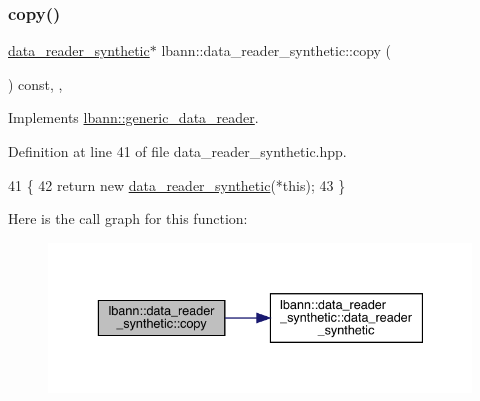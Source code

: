 \subsubsection{\texorpdfstring{copy()}{copy()}}
{\footnotesize\ttfamily \hyperlink{classlbann_1_1data__reader__synthetic}{data\+\_\+reader\+\_\+synthetic}$\ast$ lbann\+::data\+\_\+reader\+\_\+synthetic\+::copy (\begin{DoxyParamCaption}{ }\end{DoxyParamCaption}) const\hspace{0.3cm}{\ttfamily [inline]}, {\ttfamily [override]}, {\ttfamily [virtual]}}



Implements \hyperlink{classlbann_1_1generic__data__reader_a208ba1223e7aaa75e94b728501f12f86}{lbann\+::generic\+\_\+data\+\_\+reader}.



Definition at line 41 of file data\+\_\+reader\+\_\+synthetic.\+hpp.


\begin{DoxyCode}
41                                                \{
42     \textcolor{keywordflow}{return} \textcolor{keyword}{new} \hyperlink{classlbann_1_1data__reader__synthetic_a9d1cf28b223c11e4fdc776b0d364685d}{data\_reader\_synthetic}(*\textcolor{keyword}{this});
43   \}
\end{DoxyCode}
Here is the call graph for this function\+:\nopagebreak
\begin{figure}[H]
\begin{center}
\leavevmode
\includegraphics[width=336pt]{classlbann_1_1data__reader__synthetic_a9d7ef789329af4b2a96326ac88803f9e_cgraph}
\end{center}
\end{figure}
\mbox{\label{classlbann_1_1data__reader__synthetic_af90ce15d2c6f30a921ffa54ee5547565}} 

